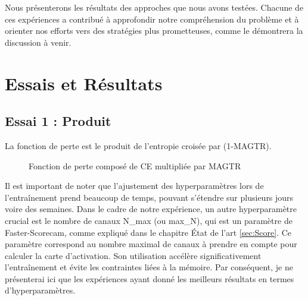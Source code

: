\documentclass{report}
\begin{document}
{\begin{itemize}
            \end{itemize}
\hspace{1.6cm}Nous présenterons les résultats des approches que nous avons testées. Chacune de ces expériences a contribué à approfondir notre compréhension du problème et à orienter nos efforts vers des stratégies plus prometteuses, comme le démontrera la discussion à venir.

\section{Essais et Résultats}
\subsection{Essai 1 : Produit}
La fonction de perte est le produit de l'entropie croisée par (1-MAGTR).
    \begin{figure}[htbp] 
	\centering
	\caption{Fonction de perte composé de CE multipliée par MAGTR}
	\label{fig:Fonction de perte composé de CE multipliée par MAGTR}
    \end{figure}


\hspace{1.6cm}Il est important de noter que l'ajustement des hyperparamètres lors de l'entraînement prend beaucoup de temps, pouvant s'étendre sur plusieurs jours voire des semaines. Dans le cadre de notre expérience, un autre hyperparamètre crucial est le nombre de canaux N\_max (ou max\_N), qui est un paramètre de Faster-Scorecam, comme expliqué dans le chapitre État de l'art \autoref{sec:Score}. Ce paramètre correspond au nombre maximal de canaux à prendre en compte pour calculer la carte d'activation. Son utilisation accélère significativement l'entraînement et évite les contraintes liées à la mémoire. Par conséquent, je ne présenterai ici que les expériences ayant donné les meilleurs résultats en termes d'hyperparamètres.
\vspace*{0.5\baselineskip}

}
\end{document}
